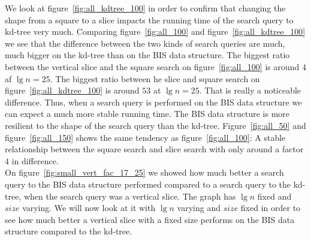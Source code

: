 We look at figure~\ref{fig:all_kdtree_100} in order to confirm that changing the shape from a square to a slice impacts the running time of the search query to kd-tree very much. Comparing figure~\ref{fig:all_100} and figure~\ref{fig:all_kdtree_100} we see that the difference between the two kinds of search queries are much, much bigger on the kd-tree than on the BIS data structure. The biggest ratio between the vertical slice and the square search on figure~\ref{fig:all_100} is around $4$ af $\lg n = 25$. The biggest ratio between he slice and square search on figure~\ref{fig:all_kdtree_100} is around $53$ at $\lg n = 25$. That is really a noticeable difference. Thus, when a search query is performed on the BIS data structure we can expect a much more stable running time. The BIS data structure is more resilient to the shape of the search query than the kd-tree. Figure~\ref{fig:all_50} and figure~\ref{fig:all_150} shows the same tendency as figure~\ref{fig:all_100}: A stable relationship between the square search and slice search with only around a factor $4$ in difference. \\

On figure~\ref{fig:small_vert_fac_17_25} we showed how much better a search query to the BIS data structure performed compared to a search query to the kd-tree, when the search query was a vertical slice. The graph has $\lg n$ fixed and $size$ varying. We will now look at it with $\lg n$ varying and $size$ fixed in order to see how much better a vertical slice with a fixed size performs on the BIS data structure compared to the kd-tree.



